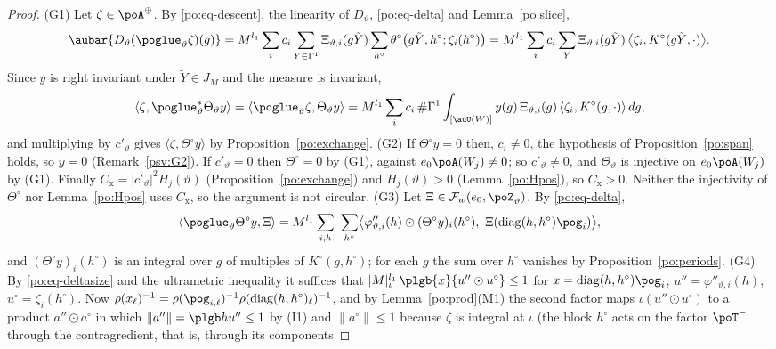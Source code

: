 \documentclass[10pt]{amsart}
\theoremstyle{definition}
\theoremstyle{remark}
\begin{document}
\begin{proof}
(G1) Let $\zeta\in\poA^\oplus$. By \eqref{po:eq-descent}, the linearity of $D_\vartheta$,
\eqref{po:eq-delta} and Lemma~\ref{po:slice},
\[
\aubar{D_\vartheta(\poglue_\vartheta\zeta)(g)}=M^{l_1}\sum_ic_i\sum_{Y\in\Gamma^1}\Xi_{\vartheta,i}
(g\tilde Y)\sum_{h^\circ}\theta^\circ\bigl(g\tilde Y,h^\circ;\zeta_i(h^\circ)\bigr)=M^{l_1}\sum_ic_i
\sum_Y\Xi_{\vartheta,i}(g\tilde Y)\,\bigl\langle\zeta_i,K^\circ(g\tilde Y,\cdot)\bigr\rangle .
\]
Since $y$ is right invariant under $\tilde Y\in J_M$ and the measure is invariant,
\[
\langle\zeta,\poglue_\vartheta^*\Theta_\vartheta y\rangle=\langle\poglue_\vartheta\zeta,
\Theta_\vartheta y\rangle=M^{l_1}\sum_ic_i\,\#\Gamma^1\int_{[\auU(W)]}y(g)\,\Xi_{\vartheta,i}(g)\,
\langle\zeta_i,K^\circ(g,\cdot)\rangle\,dg ,
\]
and multiplying by $c'_\vartheta$ gives $\langle\zeta,\Theta^\circ y\rangle$ by
Proposition~\ref{po:exchange}.
(G2) If $\Theta^\circ y=0$ then, $c_i\ne0$, the hypothesis of Proposition~\ref{po:span} holds, so
$y=0$ (Remark~\ref{psv:G2}). If $c'_\vartheta=0$ then $\Theta^\circ=0$ by (G1), against
$e_0\poA(W_j)\ne0$; so $c'_\vartheta\ne0$, and $\Theta_\vartheta$ is injective on $e_0\poA(W_j)$ by
(G1). Finally $C_{\mathrm x}=|c'_\vartheta|^2H_j(\vartheta)$ (Proposition~\ref{po:exchange}) and
$H_j(\vartheta)>0$ (Lemma~\ref{po:Hpos}), so $C_{\mathrm x}>0$. Neither the injectivity of
$\Theta^\circ$ nor Lemma~\ref{po:Hpos} uses $C_{\mathrm x}$, so the argument is not circular.
(G3) Let $\Xi\in\mathcal F_w(e_0,\poZ_\vartheta)$. By \eqref{po:eq-delta},
\[
\langle\poglue_\vartheta\Theta^\circ y,\Xi\rangle=M^{l_1}\sum_{i,h}\ \sum_{h^\circ}\bigl\langle
\varphi''_{\vartheta,i}(h)\odot(\Theta^\circ y)_i(h^\circ),\ \Xi(\operatorname{diag}(h,h^\circ)
\pog_i)\bigr\rangle ,
\]
and $(\Theta^\circ y)_i(h^\circ)$ is an integral over $g$ of multiples of $K^\circ(g,h^\circ)$; for
each $g$ the sum over $h^\circ$ vanishes by Proposition~\ref{po:periods}.
(G4) By \eqref{po:eq-deltasize} and the ultrametric inequality it suffices that
$|M|_\iota^{l_1}\,\plgb{x}{u''\odot u^\circ}\le1$ for $x=\operatorname{diag}(h,h^\circ)\pog_i$,
$u''=\varphi''_{\vartheta,i}(h)$, $u^\circ=\zeta_i(h^\circ)$. Now $\rho(x_\ell)^{-1}=\rho(\pog_{i,
\ell})^{-1}\rho(\operatorname{diag}(h,h^\circ)_\ell)^{-1}$, and by Lemma~\ref{po:prod}(M1) the second
factor maps $\iota(u''\odot u^\circ)$ to a product $a''\odot a^\circ$ in which $\|a''\|=\plgb
h{u''}\le1$ by (I1) and $\|a^\circ\|\le1$ because $\zeta$ is integral at $\iota$ (the block
$h^\circ$ acts on the factor $\poT^-$ through the contragredient, that is, through its components

\end{proof}
\end{document}

